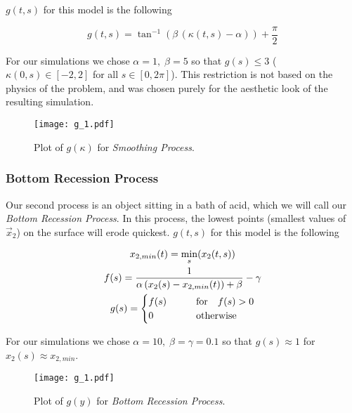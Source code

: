 $g(t, s)$ for this model is the following

\begin{equation}
  g(t, s) = \tan^{-1}(\beta \, (\kappa(t, s) - \alpha)) + \frac{\pi}{2}
\end{equation}

For our simulations we chose $\alpha = 1, \; \beta = 5$ so that $g(s) \le 3$ ($\kappa(0, s) \in [-2, 2]$ for all $s \in [0, 2\pi]$). This restriction is not based on the physics of the problem, and was chosen purely for the aesthetic look of the resulting simulation.

\begin{figure}[H]
    \begin{center}
      \texttt{[image: g\_1.pdf]}
    \end{center}
  \vspace{-.2in} %
  \caption{\label{fig:g-1} Plot of $g(\kappa)$ for \textit{Smoothing Process}.}
\end{figure}

\subsubsection*{Bottom Recession Process}

Our second process is an object sitting in a bath of acid, which we will call our \textit{Bottom Recession Process}. In this process, the lowest points (smallest values of $\vec{x}_2$) on the surface will erode quickest. $g(t, s)$ for this model is the following

\begin{gather}
  x_{2, min}(t) = \min_{s}(x_2(t, s)) \notag\\
  f(s) = \frac{1}{\alpha \, (x_2(s) - x_{2, min}(t)) + \beta} - \gamma \notag\\
  g(s) = \begin{cases}
    f(s) \qquad &\text{for} \quad f(s) > 0\\
    0 \qquad &\text{otherwise}
  \end{cases}
\end{gather}

For our simulations we chose $\alpha = 10, \; \beta = \gamma = 0.1$ so that $g(s) \approx 1$ for $x_2(s) \approx x_{2,min}$.

\begin{figure}[H]
    \begin{center}
      \texttt{[image: g\_1.pdf]}
    \end{center}
  \vspace{-.2in} %
  \caption{\label{fig:g-2} Plot of $g(y)$ for \textit{Bottom Recession Process}.}
\end{figure}


